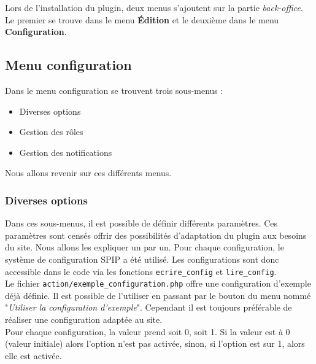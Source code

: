 Lors de l'installation du plugin, deux menus s'ajoutent sur la partie \textit{back-office}. Le premier se trouve dans le menu \textbf{Édition} et le deuxième dans le menu \textbf{Configuration}. 

\subsection{Menu configuration} \label{subsection:configuration}

Dans le menu configuration se trouvent trois sous-menus :
\begin{itemize}
    \item Diverses options
    \item Gestion des rôles
    \item Gestion des notifications
\end{itemize}
Nous allons revenir sur ces différents menus.

\subsubsection*{Diverses options} \label{subsubsection:diverses-options}
Dans ces sous-menus, il est possible de définir différents paramètres. Ces paramètres sont censés offrir des possibilités d'adaptation du plugin aux besoins du site. Nous allons les expliquer un par un. Pour chaque configuration, le système de configuration SPIP a été utilisé. Les configurations sont donc accessible dans le code via les fonctions \texttt{ecrire\_config} et \texttt{lire\_config}.\\
\newline
Le fichier \texttt{action/exemple\_configuration.php} offre une configuration d'exemple déjà définie. Il est possible de l'utiliser en passant par le bouton du menu nommé "\textit{Utiliser la configuration d'exemple}". Cependant il est toujours préférable de réaliser une configuration adaptée au site.\\
\newline
Pour chaque configuration, la valeur prend soit 0, soit 1. Si la valeur est à 0 (valeur initiale) alors l'option n'est pas activée, sinon, si l'option est sur 1, alors elle est activée.

\newpage


